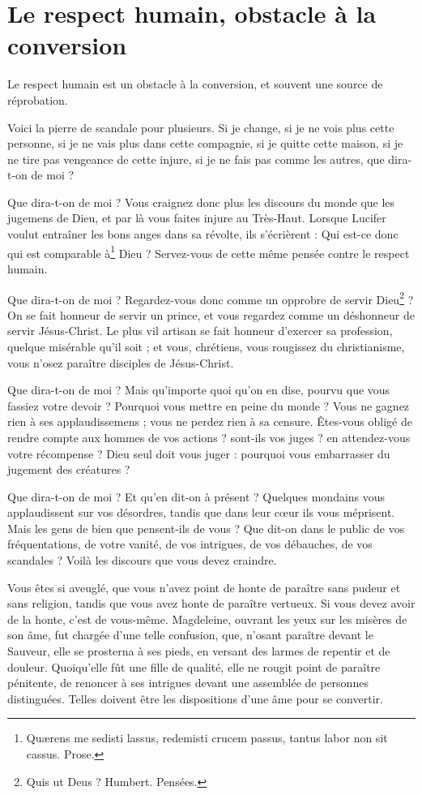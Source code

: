 \documentclass[instructions.tex]{subfiles}
\begin{document}
\chapter{Le respect humain, obstacle à la conversion}

\primo Le respect humain est un obstacle à la conversion, et souvent une source de réprobation.

Voici la pierre de scandale pour plusieurs. Si je change, si je ne vois plus cette personne, si je ne vais plus dans cette compagnie, si je quitte cette maison, si je ne tire pas vengeance de cette injure, si je ne fais pas comme les autres, que dira-t-on de moi ?

Que dira-t-on de moi ? Vous craignez donc plus les discours du monde que les jugemens de Dieu, et par là vous faites injure au Très-Haut. Lorsque Lucifer voulut entraîner les bons anges dans sa révolte, ils s’écrièrent : Qui est-ce donc qui est comparable à\footnote{Quærens me sedisti lassus, redemisti crucem passus, tantus labor non sit cassus. Prose.} Dieu ? Servez-vous de cette même pensée contre le respect humain.

Que dira-t-on de moi ? Regardez-vous donc comme un opprobre de servir Dieu\footnote{Quis ut Deus ? Humbert. Pensées.} ? On se fait honneur de servir un prince, et vous regardez comme un déshonneur de servir Jésus-Christ. Le plus vil artisan se fait honneur d’exercer sa profession, quelque misérable qu’il soit ; et vous, chrétiens, vous rougissez du christianisme, vous n’osez paraître disciples de Jésus-Christ.

Que dira-t-on de moi ? Mais qu’importe quoi qu’on en dise, pourvu que vous fassiez votre devoir ? Pourquoi vous mettre en peine du monde ? Vous ne gagnez rien à ses applaudissemens ; vous ne perdez rien à sa censure. Êtes-vous obligé de rendre compte aux hommes de vos actions ? sont-ils vos juges ? en attendez-vous votre récompense ? Dieu seul doit vous juger : pourquoi vous embarrasser du jugement des créatures ?

Que dira-t-on de moi ? Et qu’en dit-on à présent ? Quelques mondains vous applaudissent sur vos désordres, tandis que dans leur cœur ils vous méprisent. Mais les gens de bien que pensent-ils de vous ? Que dit-on dans le public de vos fréquentations, de votre vanité, de vos intrigues, de vos débauches, de vos scandales ? Voilà les discours que vous devez craindre.

Vous êtes si aveuglé, que vous n’avez point de honte de paraître sans pudeur et sans religion, tandis que vous avez honte de paraître vertueux. Si vous devez avoir de la honte, c’est de vous-même. Magdeleine, ouvrant les yeux sur les misères de son âme, fut chargée d’une telle confusion, que, n’osant paraître devant le Sauveur, elle se prosterna à ses pieds, en versant des larmes de repentir et de douleur. Quoiqu’elle fût une fille de qualité, elle ne rougit point de paraître pénitente, de renoncer à ses intrigues devant une assemblée de personnes distinguées. Telles doivent être les dispositions d’une âme pour se convertir.
\end{document}
